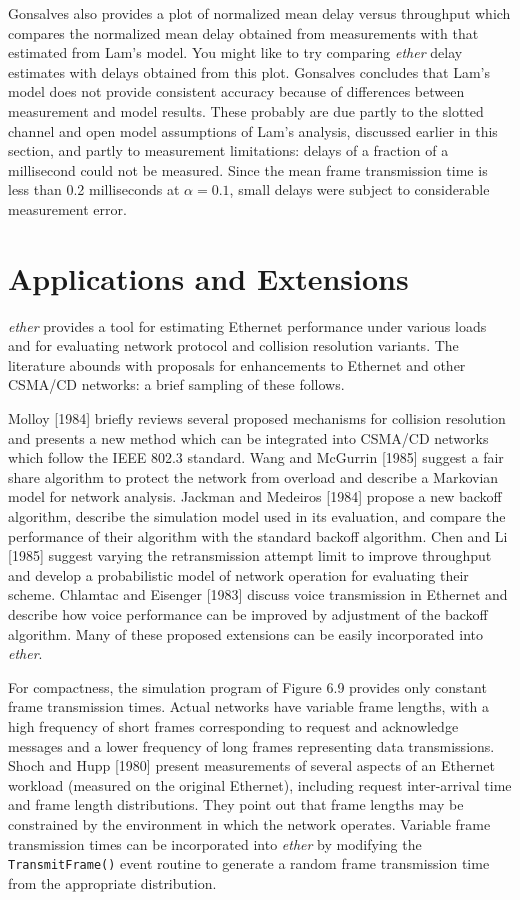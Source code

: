 Gonsalves also provides a plot of normalized mean delay versus throughput which compares the normalized mean delay obtained from measurements with that estimated from Lam's model. You might like to try comparing \emph{ether} delay estimates with delays obtained from this plot. Gonsalves concludes that Lam's model does not provide consistent accuracy because of differences between measurement and model results. These probably are due partly to the slotted channel and open model assumptions of Lam's analysis, discussed earlier in this section, and partly to measurement limitations: delays of a fraction of a millisecond could not be measured. Since the mean frame transmission time is less than 0.2 milliseconds at $\alpha=0.1$, small delays were subject to considerable measurement error.

\section{Applications and Extensions}

\emph{ether} provides a tool for estimating Ethernet performance under various loads and for evaluating network protocol and collision resolution variants. The literature abounds with proposals for enhancements to Ethernet and other CSMA/CD networks: a brief sampling of these follows.

Molloy [1984] briefly reviews several proposed mechanisms for collision resolution and presents a new method which can be integrated into CSMA/CD networks which follow the IEEE 802.3 standard. Wang and McGurrin [1985] suggest a fair share algorithm to protect the network from overload and describe a Markovian model for network analysis. Jackman and Medeiros [1984] propose a new backoff algorithm, describe the simulation model used in its evaluation, and compare the performance of their algorithm with the standard backoff algorithm. Chen and Li [1985] suggest varying the retransmission attempt limit to improve throughput and develop a probabilistic model of network operation for evaluating their scheme. Chlamtac and Eisenger [1983] discuss voice transmission in Ethernet and describe how voice performance can be improved by adjustment of the backoff algorithm. Many of these proposed extensions can be easily incorporated into \emph{ether}.

For compactness, the simulation program of Figure 6.9 provides only constant frame transmission times. Actual networks have variable frame lengths, with a high frequency of short frames corresponding to request and acknowledge messages and a lower frequency of long frames representing data transmissions. Shoch and Hupp [1980] present measurements of several aspects of an Ethernet workload (measured on the original Ethernet), including request inter-arrival time and frame length distributions. They point out that frame lengths may be constrained by the environment in which the network operates. Variable frame transmission times can be incorporated into \emph{ether} by modifying the \texttt{TransmitFrame()} event routine to generate a random frame transmission time from the appropriate distribution.

